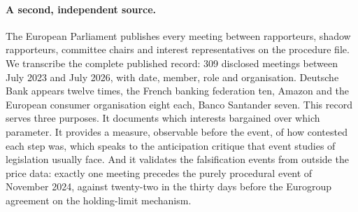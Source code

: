 \documentclass[11pt]{article}
\theoremstyle{plain}\newtheorem{proposition}{Proposition}
\begin{document}
\paragraph{A second, independent source.} The European Parliament publishes every meeting between rapporteurs, shadow rapporteurs, committee chairs and interest representatives on the procedure file. We transcribe the complete published record: 309 disclosed meetings between July 2023 and July 2026, with date, member, role and organisation. Deutsche Bank appears twelve times, the French banking federation ten, Amazon and the European consumer organisation eight each, Banco Santander seven. This record serves three purposes. It documents which interests bargained over which parameter. It provides a measure, observable before the event, of how contested each step was, which speaks to the anticipation critique that event studies of legislation usually face. And it validates the falsification events from outside the price data: exactly one meeting precedes the purely procedural event of November 2024, against twenty-two in the thirty days before the Eurogroup agreement on the holding-limit mechanism.
\end{document}

